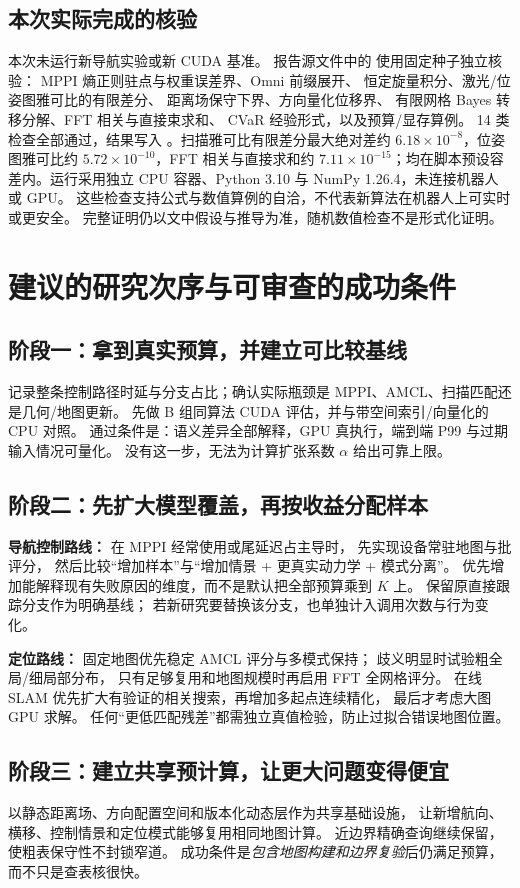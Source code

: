 \subsection{本次实际完成的核验}
本次未运行新导航实验或新 CUDA 基准。
报告源文件中的  使用固定种子独立核验：
MPPI 熵正则驻点与权重误差界、Omni 前缀展开、
恒定旋量积分、激光/位姿图雅可比的有限差分、
距离场保守下界、方向量化位移界、
有限网格 Bayes 转移分解、FFT 相关与直接束求和、
CVaR 经验形式，以及预算/显存算例。
14 类检查全部通过，结果写入 。扫描雅可比有限差分最大绝对差约 $6.18\times10^{-8}$，位姿图雅可比约 $5.72\times10^{-10}$，FFT 相关与直接求和约 $7.11\times10^{-15}$；均在脚本预设容差内。运行采用独立 CPU 容器、Python 3.10 与 NumPy 1.26.4，未连接机器人或 GPU。
这些检查支持公式与数值算例的自洽，不代表新算法在机器人上可实时或更安全。
完整证明仍以文中假设与推导为准，随机数值检查不是形式化证明。

\section{建议的研究次序与可审查的成功条件}
\subsection{阶段一：拿到真实预算，并建立可比较基线}
记录整条控制路径时延与分支占比；确认实际瓶颈是 MPPI、AMCL、扫描匹配还是几何/地图更新。
先做 B 组同算法 CUDA 评估，并与带空间索引/向量化的 CPU 对照。
通过条件是：语义差异全部解释，GPU 真执行，端到端 P99 与过期输入情况可量化。
没有这一步，无法为计算扩张系数 $\alpha$ 给出可靠上限。

\subsection{阶段二：先扩大模型覆盖，再按收益分配样本}
\textbf{导航控制路线：}
在 MPPI 经常使用或尾延迟占主导时，
先实现设备常驻地图与批评分，
然后比较“增加样本”与“增加情景 + 更真实动力学 + 模式分离”。
优先增加能解释现有失败原因的维度，而不是默认把全部预算乘到 $K$ 上。
保留原直接跟踪分支作为明确基线；
若新研究要替换该分支，也单独计入调用次数与行为变化。

\textbf{定位路线：}
固定地图优先稳定 AMCL 评分与多模式保持；
歧义明显时试验粗全局/细局部分布，
只有足够复用和地图规模时再启用 FFT 全网格评分。
在线 SLAM 优先扩大有验证的相关搜索，再增加多起点连续精化，
最后才考虑大图 GPU 求解。
任何“更低匹配残差”都需独立真值检验，防止过拟合错误地图位置。

\subsection{阶段三：建立共享预计算，让更大问题变得便宜}
以静态距离场、方向配置空间和版本化动态层作为共享基础设施，
让新增航向、横移、控制情景和定位模式能够复用相同地图计算。
近边界精确查询继续保留，使粗表保守性不封锁窄道。
成功条件是\emph{包含地图构建和边界复验}后仍满足预算，而不只是查表核很快。

